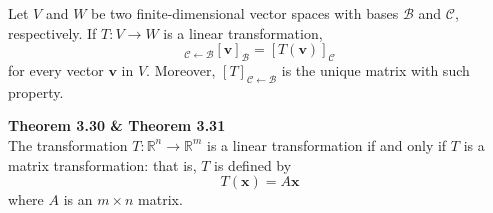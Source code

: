 \begin{theorem}
	Let $V$ and $W$ be two finite-dimensional vector spaces with bases $\mathcal{B}$ and $\mathcal{C}$, respectively. If $T: V \rightarrow W$ is a linear transformation, \begin{equation*}
		[T]_{\mathcal{C} \leftarrow \mathcal{B}}[\textbf{v}]_\mathcal{B} = [T(\textbf{v})]_\mathcal{C}
	\end{equation*} for every vector $\textbf{v}$ in $V$. {\color{blue}Moreover, $[T]_{ \mathcal{C} \leftarrow \mathcal{B} }$ is the unique matrix with such property.}
\end{theorem}

\textbf{Theorem 3.30 \& Theorem 3.31} \\
The transformation $T: \mathbb{R}^n \rightarrow \mathbb{R}^m$ is a linear transformation if and only if $T$ is a matrix transformation: that is, $T$ is defined by \begin{equation*}
	T(\textbf{x}) = A\textbf{x}
\end{equation*} where $A$ is an $m \times n$ matrix.

